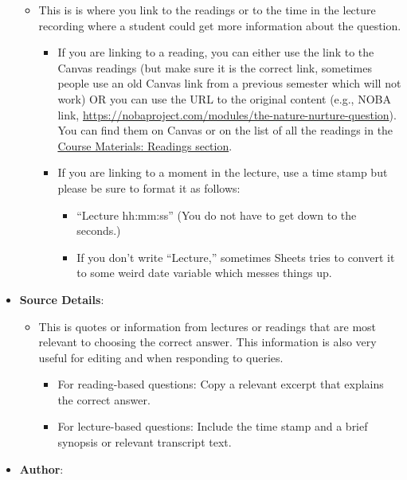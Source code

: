 \documentclass[
]{article}
\providecommand{\tightlist}{%
  \setlength{\itemsep}{0pt}\setlength{\parskip}{0pt}}
\begin{document}
\begin{itemize}
  \begin{itemize}
  \tightlist
  \item
    This is is where you link to the readings or to the time in the lecture recording where a student could get more information about the question.

    \begin{itemize}
    \tightlist
    \item
      If you are linking to a reading, you can either use the link to the Canvas readings (but make sure it is the correct link, sometimes people use an old Canvas link from a previous semester which will not work) OR you can use the URL to the original content (e.g., NOBA link, \url{https://nobaproject.com/modules/the-nature-nurture-question}). You can find them on Canvas or on the list of all the readings in the \protect\hyperlink{course-materials}{Course Materials: Readings section}.
    \item
      If you are linking to a moment in the lecture, use a time stamp but please be sure to format it as follows:

      \begin{itemize}
      \tightlist
      \item
        ``Lecture hh:mm:ss'' (You do not have to get down to the seconds.)
      \item
        If you don't write ``Lecture,'' sometimes Sheets tries to convert it to some weird date variable which messes things up.
      \end{itemize}
    \end{itemize}
  \end{itemize}
\item
  \textbf{Source Details}:

  \begin{itemize}
  \tightlist
  \item
    This is quotes or information from lectures or readings that are most relevant to choosing the correct answer. This information is also very useful for editing and when responding to queries.

    \begin{itemize}
    \tightlist
    \item
      For reading-based questions: Copy a relevant excerpt that explains the correct answer.
    \item
      For lecture-based questions: Include the time stamp and a brief synopsis or relevant transcript text.
    \end{itemize}
  \end{itemize}
\item
  \textbf{Author}:


\end{itemize}
\end{document}
